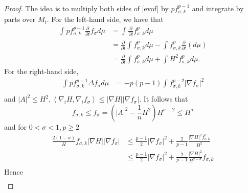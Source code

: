 \begin{proof}
    The idea is to multiply both sides of \autoref{evof} by $p f_{\sigma ,k}^{p-1} $ and integrate by parts over $M_t$.
    For the left-hand side, we have that 
    \begin{equation*}
    \begin{split}
        \int_{}^{} p f_{\sigma ,k}^{p-1} \frac{\partial }{\partial t} f_{\sigma }^{} d \mu  
    &= \int_{}^{}\frac{\partial }{\partial t} f_{\sigma ,k}^{p} d \mu  \\
    &= \frac{\partial }{\partial t} \int_{}^{} f_{\sigma ,k}^{p} d \mu - \int_{}^{} f_{\sigma ,k}^{p} \frac{\partial }{\partial t} (d \mu) \\
    &= \frac{\partial }{\partial t} \int_{}^{} f_{\sigma ,k}^{p} d \mu + \int_{}^{}H^2 f_{\sigma ,k}^{p} d \mu . 
    \end{split}
    \end{equation*}
    For the right-hand side, 
    \begin{equation*}
    \begin{split}
        \int_{}^{} p f_{\sigma ,k}^{p-1} \Delta f_{\sigma }^{} d \mu  
    &=  -p(p-1)\int_{}^{}f_{\sigma ,k}^{p-2} \left| \nabla f_{\sigma }^{}  \right| ^2\\
    \end{split}
    \end{equation*} 
    and $ \left| A \right| ^2 \leq H^2, \left\langle \nabla _i H, \nabla_{i}^{} f_\sigma  \right\rangle \leq \left| \nabla H \right| \left| \nabla f_{\sigma }^{}  \right| .$ 
    It follows that 
    \[f_{\sigma ,k}^{} \leq f_{\sigma }^{} = \left( \left| A \right| ^2-\frac{1}{n}H^2 \right) H^{\sigma-2} \leq H^{\sigma } \]
    and for $0<\sigma <1, p \geq 2$ 
    \begin{equation*}
    \begin{split}
        \frac{2(1-\sigma )}{H}f_{\sigma,k }^{} \left| \nabla H \right| \left| \nabla f_{\sigma }^{}  \right| 
    &\leq \frac{p-1}{2} \left| \nabla f_{\sigma }^{}  \right|^2 + \frac{2}{p-1} \frac{\left| \nabla H \right| ^2 f_{\sigma ,k}^{2} }{H^2}  \\
    & \leq \frac{p-1}{2} \left| \nabla f_{\sigma }^{}  \right|^2 + \frac{2}{p-1} \frac{\left| \nabla H \right| ^2 }{H^{2-\sigma }} f_{\sigma ,k}^{}   \\
    \end{split}
    \end{equation*} 
    Hence
    \begin{equation*}
        \begin{split}

\end{split}
\end{equation*}
\end{proof}
